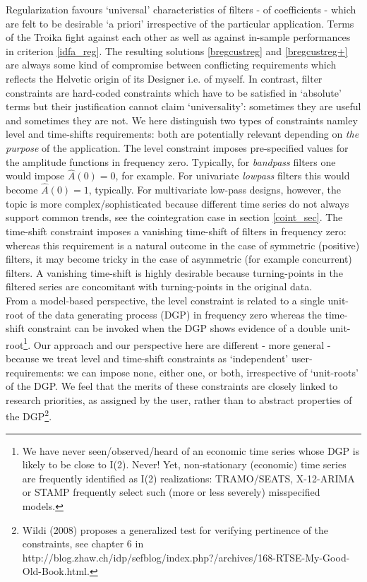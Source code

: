 \documentclass[11pt]{article}
\begin{document}
Regularization favours `universal' characteristics of filters - of coefficients -  which are felt to be desirable `a priori' irrespective of the particular application. 
Terms of the Troika fight against each other as well as against in-sample performances in criterion \ref{idfa_reg}. The resulting solutions \ref{bregcustreg} and \ref{bregcustreg+} are always some kind of  compromise between conflicting requirements which reflects the Helvetic origin of its Designer i.e. of myself. In contrast, filter constraints are hard-coded constraints which have to be satisfied in `absolute' terms but their justification cannot claim `universality': sometimes they are useful and sometimes they are not. We here distinguish two types of constraints namley level and time-shifts requirements: both are potentially relevant depending on \emph{the purpose} of the application. The level constraint imposes pre-specified values for the amplitude functions  in frequency zero. Typically, for \emph{bandpass} filters one would impose $\hat{A}(0)=0$, for example. For univariate \emph{lowpass} filters this would become $\hat{A}(0)=1$, typically. For multivariate low-pass designs, however, the topic is more complex/sophisticated because different time series do not always support common trends, see the cointegration case in section \ref{coint_sec}. The time-shift constraint imposes a vanishing time-shift of filters in frequency zero: whereas this requirement is a natural outcome in the case of  symmetric (positive) filters, it may become tricky in the case of asymmetric (for example concurrent) filters. A vanishing time-shift is highly desirable because turning-points in the filtered series are concomitant with turning-points in the original data. \\
From a model-based perspective, the level constraint is related to a single unit-root of the data generating process (DGP) in frequency zero whereas the time-shift constraint can be invoked when the DGP shows evidence of  a double unit-root\footnote{We have never seen/observed/heard of an economic time series whose DGP is likely to be close to I(2). Never! Yet, non-stationary (economic) time series are frequently identified as I(2) realizations: TRAMO/SEATS, X-12-ARIMA or STAMP frequently select such (more or less severely) misspecified models.}. Our approach and our perspective here are  different - more general - because we treat level and time-shift constraints as `independent' user-requirements: we can impose none, either one, or both, irrespective of `unit-roots' of the DGP. We feel that the merits of these constraints are closely linked to research priorities, as assigned by the user, rather than to abstract properties of the DGP\footnote{ Wildi (2008) proposes a generalized test for verifying pertinence of the constraints, see chapter 6 in  http://blog.zhaw.ch/idp/sefblog/index.php?/archives/168-RTSE-My-Good-Old-Book.html.}.\\
\end{document}
